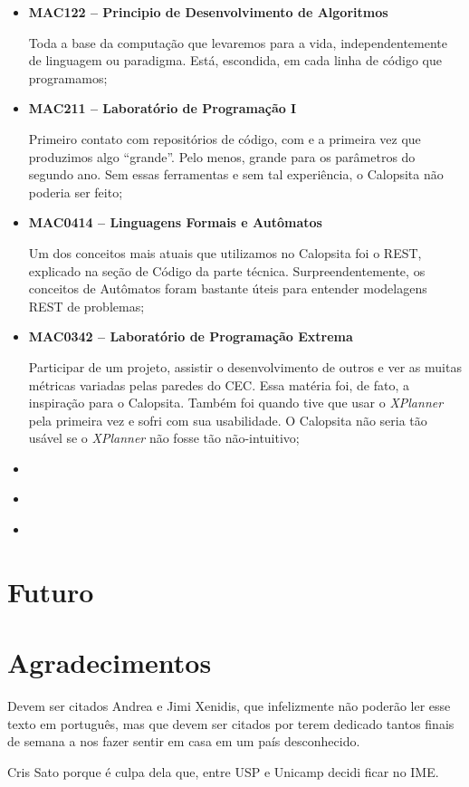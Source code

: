 \documentclass[titlepage,a4paper]{article}
\newcommand{\calopsita}{Calopsita}
\begin{document}
\begin{itemize}
	\item{\textbf{MAC122 -- Principio de Desenvolvimento de Algoritmos}

		Toda a base da computação que levaremos para a vida, independentemente de linguagem ou paradigma. Está, escondida, em cada linha de código que programamos;}
	\item{\textbf{MAC211 -- Laboratório de Programação I} 

		Primeiro contato com repositórios de código, com \latex{} e a primeira vez que produzimos algo ``grande''. Pelo menos, grande para os parâmetros do segundo ano. Sem essas ferramentas e sem tal experiência, o \calopsita{} não poderia ser feito;}
	\item{\textbf{MAC0414 -- Linguagens Formais e Autômatos} 

		Um dos conceitos mais atuais que utilizamos no \calopsita{} foi o REST, explicado na seção de Código da parte técnica. Surpreendentemente, os conceitos de Autômatos foram bastante úteis para entender modelagens REST de problemas;}
	\item{\textbf{MAC0342 -- Laboratório de Programação Extrema}

		Participar de um projeto, assistir o desenvolvimento de outros e ver as muitas métricas variadas pelas paredes do CEC. Essa matéria foi, de fato, a inspiração para o \calopsita{}. Também foi quando tive que usar o \textit{XPlanner} pela primeira vez e sofri com sua usabilidade. O \calopsita{} não seria tão usável se o \textit{XPlanner} não fosse tão não-intuitivo;}
	\item{\textbf{} }
	\item{\textbf{} }
	\item{\textbf{} }
\end{itemize}

\section{Futuro}

\section{Agradecimentos}

Devem ser citados Andrea e Jimi Xenidis, que infelizmente não poderão ler esse texto em português, mas que devem ser citados por terem dedicado tantos finais de semana a nos fazer sentir em casa em um país desconhecido.

Cris Sato porque é culpa dela que, entre USP e Unicamp decidi ficar no IME.
\end{document}
